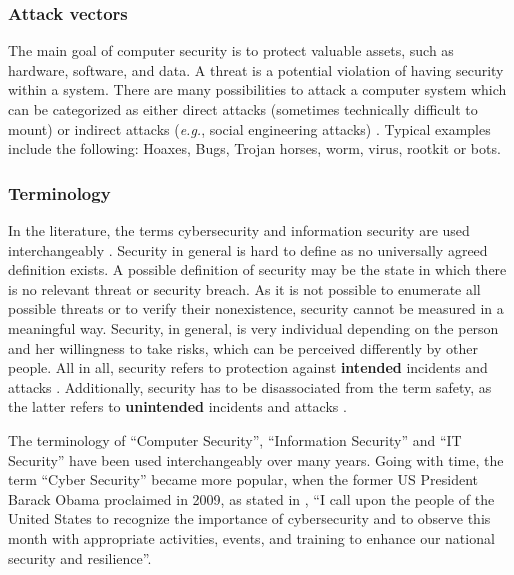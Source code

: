 \subsubsection{Attack vectors}
The main goal of computer security is to protect valuable assets, such as hardware, software, and data. A threat is a potential violation of having security within a system. There are many possibilities to attack a computer system which can be categorized as either direct attacks (sometimes technically difficult to mount) or indirect attacks (\textit{e.g.}, social engineering attacks) \cite{Bishop2003}. Typical examples include the following: Hoaxes, Bugs, Trojan horses,  worm, virus, rootkit or bots.

\subsubsection{Terminology}
In the literature, the terms cybersecurity and information security are used interchangeably \cite{VonSolms2013}. Security in general is hard to define as no universally agreed definition exists. A possible definition of security may be the state in which there is no relevant threat or security breach. As it is not possible to enumerate all possible threats or to verify their nonexistence, security cannot be measured in a meaningful way. Security, in general, is very individual depending on the person and her willingness to take risks, which can be perceived differently by other people. All in all, security refers to protection against \textbf{intended} incidents and attacks \cite{Bishop2004, Pfleeger2014}. Additionally, security has to be disassociated from the term safety, as the latter refers to \textbf{unintended} incidents and attacks \cite{Bishop2004}.

The terminology of ``Computer Security'', ``Information Security'' and ``IT Security'' have been used interchangeably over many years. Going with time, the term ``Cyber Security'' became more popular, when the former US President Barack Obama proclaimed in 2009, as stated in \cite{TheWhiteHouse2009}, ``I call upon the people of the United States to recognize the importance of cybersecurity and to observe this month with appropriate activities, events, and training to enhance our national security and resilience''.









